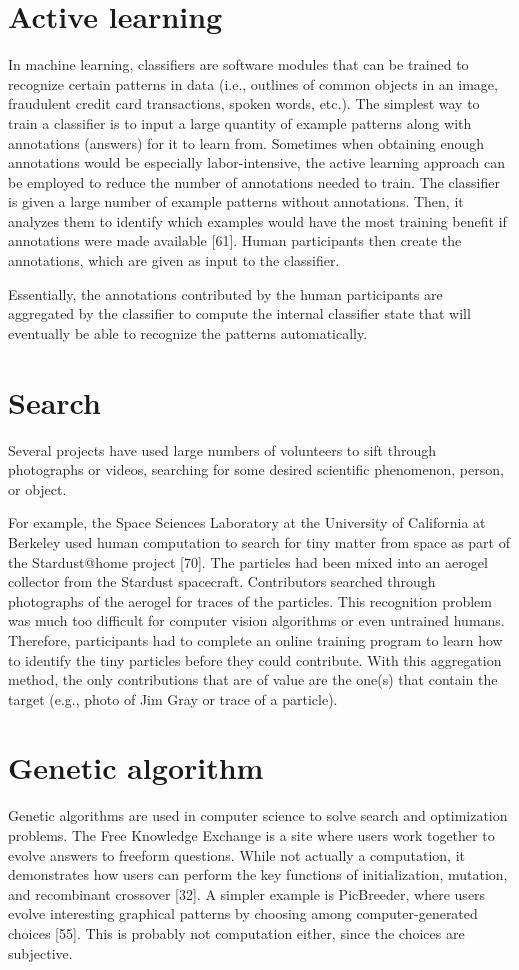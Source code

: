 \documentclass{acm_proc_article-sp}
\begin{document}
\section*{Active learning}
In machine learning, classifiers are software modules that can be trained to recognize certain patterns in data (i.e., outlines of common objects in an image, fraudulent credit card transactions, spoken words, etc.). The simplest way to train a classifier is to input a large quantity of example patterns along with annotations (answers) for it to learn from. Sometimes when obtaining enough annotations would be especially labor-intensive, the active learning approach can be employed to reduce the number of annotations needed to train. The classifier is given a large number of example patterns without annotations. Then, it analyzes them to identify which examples would have the most training benefit if annotations were made available [61]. Human participants then create the annotations, which are given as input to the classifier.

Essentially, the annotations contributed by the human participants are aggregated by the classifier to compute the internal classifier state that will eventually be able to recognize the patterns automatically.
\section*{Search}
Several projects have used large numbers of volunteers to sift through photographs or videos, searching for some desired scientific phenomenon, person, or object.

For example, the Space Sciences Laboratory at the University of California at Berkeley used human computation to search for tiny matter from space as part of the Stardust@home project [70]. The particles had been mixed into an aerogel collector from the Stardust spacecraft. Contributors searched through photographs of the aerogel for traces of the particles. This recognition problem was much too difficult for computer vision algorithms or even untrained humans. Therefore, participants had to complete an online training program to learn how to identify the tiny particles before they could contribute. With this aggregation method, the only contributions that are of value are the one(s) that contain the target (e.g., photo of Jim Gray or trace of a particle).
\section*{Genetic algorithm}
Genetic algorithms are used in computer science to solve search and optimization problems. The Free Knowledge Exchange is a site where users work together to evolve answers to freeform questions. While not actually a computation, it demonstrates how users can perform the key functions of initialization, mutation, and recombinant crossover [32]. A simpler example is PicBreeder, where users evolve interesting graphical patterns by choosing among computer-generated choices [55]. This is probably not computation either, since the choices are subjective.
\end{document}
